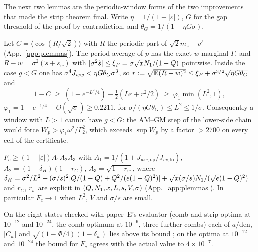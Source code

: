 The next two lemmas are the periodic-window forms of the two improvements that made the strip theorem final. Write
$\eta=1/(1-|\varepsilon|)$, $G$ for the gap threshold of the proof by contradiction, and $\theta_G=1/(1-\eta G\sigma)$.

\begin{lemma} \proofst
\label{lem:AY1P}
Let $C=\langle\cos(R/\sqrt2)\rangle$ with $R$ the periodic part of $\sqrt2m_z-v'$ (App.~\ref{app:plemmas}). The period average of $p$ has the exact
$w$-marginal $\Gamma$, and $R-w=\sigma^2(\tilde s+s_w)$ with $|\sigma^2\tilde s|\le\xi_P=\sigma\sqrt xN_1/(1-\bar Q)$ pointwise. Inside the case
$g<G$ one has $\sigma^4J_{ww}<\eta G\theta_G\sigma^3$, so $r:=\sqrt{\mathbb{E}(R-w)^2}\le\xi_P+\sigma^{3/2}\sqrt{\eta G\theta_G}$ and
\begin{equation}
1-C\;\ge\;(1-e^{-L^2/4})-\tfrac12(Lr+r^2/2)\;\ge\;\varphi_1\min(L^2,1),
\end{equation}
$\varphi_1=1-e^{-1/4}-O(\sqrt\sigma)\ge0.2211$, for $\sigma/(\eta G\theta_G)\le L^2\le1/\sigma$. Consequently a window with $L>1$ cannot have $g<G$:
the AM--GM step of the lower-side chain would force $W_p>\varphi_1\omega^2/\Gamma_2^2$, which exceeds $\sup W_p$ by a factor $>2700$ on every cell of the certificate.
\end{lemma}

\begin{lemma} \proofst
\label{lem:AY2P}
$F_c\ge(1-|\varepsilon|)A_1A_2A_3$ with $A_1=1/(1+J_{ww,\mathrm{up}}/J_{vv,\mathrm{lo}})$, $A_2=(1-\delta_H)(1-r_C)$, $A_3=\sqrt{1-r_w}$, where
$\delta_H=\sigma^2/L^2+(\sigma/s)^2[\bar Q/(1-\bar Q)+\bar Q^2/(e(1-\bar Q)^2)]+\sqrt x(\sigma/s)N_1/(\sqrt e(1-\bar Q)^2)$ and $r_C$, $r_w$ are explicit in
$(\bar Q,N_1,x,L,s,V,\sigma)$ (App.~\ref{app:plemmas}). In particular $F_c\to1$ when $L^2$, $V$ and $\sigma/s$ are small.
\end{lemma}

On the eight states checked with paper~E's evaluator (comb and strip optima at $10^{-12}$ and $10^{-24}$, the comb optimum at $10^{-6}$,
three further combs) each of $a/\mathrm{den}$, $|C_w|$ and $\sqrt{(1-\Phi/4)(1-\delta_w)}$ lies above its bound \numst; on the optima at
$10^{-12}$ and $10^{-24}$ the bound for $F_c$ agrees with the actual value to $4\times10^{-7}$.
